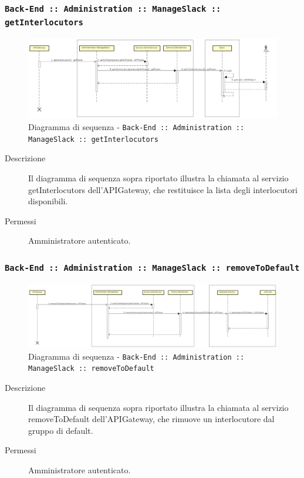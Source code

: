 \documentclass[../DefinizioneDiProdotto.tex]{subfiles}
\begin{document}
		\newpage
		\subsubsection{\texttt{Back-End :: Administration :: ManageSlack :: getInterlocutors}}
		\begin{figure}[!h]
			\centering
			\includegraphics[width=\textwidth]{DiagrammiSequenza/Back-End/manageSlack/getInterlocutors.png}
			\caption{Diagramma di sequenza - \texttt{Back-End :: Administration :: ManageSlack :: getInterlocutors}}
		\end{figure}
		\begin{description}
			\item [Descrizione] Il diagramma di sequenza sopra riportato illustra la chiamata al servizio getInterlocutors dell'APIGateway, che restituisce la lista degli interlocutori disponibili.
			\item [Permessi] Amministratore autenticato.
		\end{description}

		\subsubsection{\texttt{Back-End :: Administration :: ManageSlack :: removeToDefault}}
		\begin{figure}[!h]
			\centering
			\includegraphics[width=\textwidth]{DiagrammiSequenza/Back-End/manageSlack/removeToDefault.png}
			\caption{Diagramma di sequenza - \texttt{Back-End :: Administration :: ManageSlack :: removeToDefault }}
		\end{figure}
		\begin{description}
			\item [Descrizione] Il diagramma di sequenza sopra riportato illustra la chiamata al servizio removeToDefault dell'APIGateway, che rimuove un interlocutore dal gruppo di default.
			\item [Permessi] Amministratore autenticato.
		\end{description}
\end{document}
